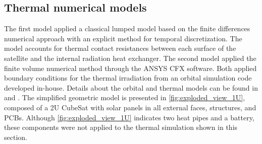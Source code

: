 






\subsection{Thermal numerical models}

The first model applied a classical lumped model based on the finite differences numerical approach with an explicit method for temporal discretization. The model accounts for thermal contact resistances between each surface of the satellite and the internal radiation heat exchanger. The second model applied the finite volume numerical method through the ANSYS CFX software. Both applied boundary conditions for the thermal irradiation from an orbital simulation code developed in-house. Details about the orbital and thermal models can be found in \cite{COBEM-Cardozo} and  \cite{gomes2022}. The simplified geometric model is presented in \autoref{fig:exploded_view_1U}, composed of a 2U CubeSat with solar panels in all external faces, structures, and PCBs. Although \autoref{fig:exploded_view_1U} indicates two heat pipes and a battery, these components were not applied to the thermal simulation shown in this section.

